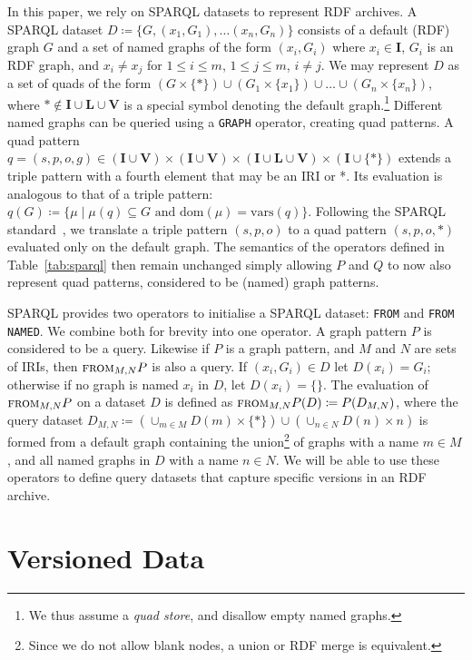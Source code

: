 \documentclass[a4paper]{llncs}
\newcommand{\I}{\ensuremath{\mathbf{I}}\xspace}
\renewcommand{\L}{\ensuremath{\mathbf{L}}\xspace}
\newcommand{\V}{\ensuremath{\mathbf{V}}\xspace}
\newcommand{\sfrom}[3]{\ensuremath{\textsc{from}_{#2,#3}#1}}
\newcommand{\dom}[1]{\ensuremath{\mathrm{dom}(#1)}}
\newcommand{\vars}[1]{\ensuremath{\mathrm{vars}(#1)}}
\begin{document}
In this paper, we rely on SPARQL datasets to represent RDF archives. A SPARQL dataset $D \coloneqq \{ G, (x_1,G_1), \ldots (x_n,G_n) \}$ consists of a default (RDF) graph $G$ and a set of named graphs of the form $(x_i,G_i)$ where $x_i \in \I$, $G_i$ is an RDF graph, and $x_i \neq x_j$ for $1 \leq i \leq m$, $1 \leq j \leq m$, $i \neq j$. We may represent $D$ as a set of quads of the form $(G \times \{*\}) \cup (G_1 \times \{x_1\}) \cup \ldots \cup (G_n \times \{x_n\})$, where $* \notin \I \cup \L \cup \V$ is a special symbol denoting the default graph.\footnote{We thus assume a \textit{quad store}, and disallow empty named graphs.} Different named graphs can be queried using a \texttt{GRAPH} operator, creating quad patterns. A quad pattern $q = (s,p,o,g) \in (\I \cup \V) \times (\I \cup \V) \times (\I \cup \L \cup \V) \times (\I \cup \{ *\})$ extends a triple pattern with a fourth element that may be an IRI or *. Its evaluation is analogous to that of a triple pattern: $q(G) \coloneqq \{ \mu \mid \mu(q) \subseteq G\text{ and }\dom{\mu} = \vars{q} \}$.
Following the SPARQL standard~\cite{sparql11}, we translate a triple pattern $(s,p,o)$ to a quad pattern $(s,p,o,*)$ evaluated only on the default graph. The semantics of the operators defined in Table~\ref{tab:sparql} then remain unchanged simply allowing $P$ and $Q$ to now also represent quad patterns, considered to be (named) graph patterns.

SPARQL provides two operators to initialise a SPARQL dataset: \texttt{FROM} and \texttt{FROM NAMED}. We combine both for brevity into one operator. A graph pattern $P$ is considered to be a query. Likewise if $P$ is a graph pattern, and $M$ and $N$ are sets of IRIs, then $\sfrom{P}{M}{N}$ is also a query. If $(x_i,G_i) \in D$ let $D(x_i) = G_i$; otherwise if no graph is named $x_i$ in $D$, let $D(x_i) = \{\}$. The evaluation of $\sfrom{P}{M}{N}$ on a dataset $D$ is defined as $\sfrom{P}{M}{N}(D) \coloneqq P(D_{M,N})$, where the query dataset $D_{M,N} \coloneqq (\cup_{m \in M} D(m) \times \{ *\}) \cup  (\cup_{n \in N} D(n) \times n)$ is formed from a default graph containing the union\footnote{Since we do not allow blank nodes, a union or RDF merge is equivalent.} of graphs with a name $m \in M$, and all named graphs in $D$ with a name $n \in N$. We will be able to use these operators to define query datasets that capture specific versions in an RDF archive.

\section{Versioned Data}
\end{document}
